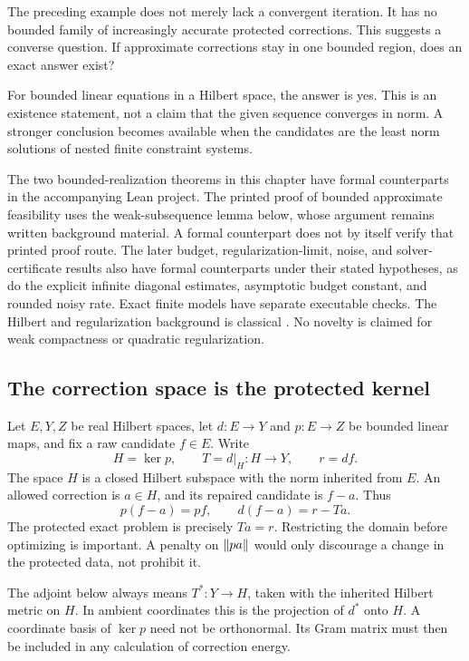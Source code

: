 \clearpage
{}\label{sec:bounded-realization}
The preceding example does not merely lack a convergent iteration. It has no bounded family of increasingly accurate protected corrections. This suggests a converse question. If approximate corrections stay in one bounded region, does an exact answer exist?

For bounded linear equations in a Hilbert space, the answer is yes. This is an existence statement, not a claim that the given sequence converges in norm. A stronger conclusion becomes available when the candidates are the least norm solutions of nested finite constraint systems.

\begin{scopebox}
The two bounded-realization theorems in this chapter have formal counterparts in the accompanying Lean project. The printed proof of bounded approximate feasibility uses the weak-subsequence lemma below, whose argument remains written background material. A formal counterpart does not by itself verify that printed proof route. The later budget, regularization-limit, noise, and solver-certificate results also have formal counterparts under their stated hypotheses, as do the explicit infinite diagonal estimates, asymptotic budget constant, and rounded noisy rate. Exact finite models have separate executable checks. The Hilbert and regularization background is classical \cite{clason-inverse}. No novelty is claimed for weak compactness or quadratic regularization.
\end{scopebox}

\subsection{The correction space is the protected kernel}
Let $E,Y,Z$ be real Hilbert spaces, let $d:E\to Y$ and $p:E\to Z$ be bounded linear maps, and fix a raw candidate $f\in E$. Write
\[
 H=\ker p,\qquad T=d|_H:H\to Y,\qquad r=df.
\]
The space $H$ is a closed Hilbert subspace with the norm inherited from $E$. An allowed correction is $a\in H$, and its repaired candidate is $f-a$. Thus
\[
 p(f-a)=pf,\qquad d(f-a)=r-Ta.
\]
The protected exact problem is precisely $Ta=r$. Restricting the domain before optimizing is important. A penalty on $\left\lVert pa\right\rVert$ would only discourage a change in the protected data, not prohibit it.

The adjoint below always means $T^*:Y\to H$, taken with the inherited Hilbert metric on $H$. In ambient coordinates this is the projection of $d^*$ onto $H$. A coordinate basis of $\ker p$ need not be orthonormal. Its Gram matrix must then be included in any calculation of correction energy.

